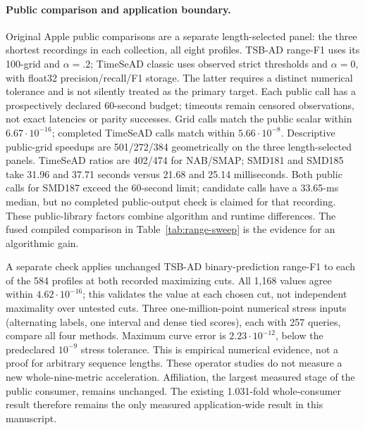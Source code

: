 \paragraph{Public comparison and application boundary.}
Original Apple public comparisons are a separate length-selected panel: the three
shortest recordings in each collection, all eight profiles. TSB-AD range-F1
uses its 100-grid and $\alpha=.2$; TimeSeAD classic uses observed strict
thresholds and $\alpha=0$, with float32 precision/recall/F1 storage. The latter
requires a distinct numerical tolerance and is not silently treated as the
primary target. Each public call has a prospectively declared 60-second budget;
timeouts remain censored observations, not exact latencies or parity successes.
Grid calls match the public scalar within $6.67\cdot10^{-16}$; completed
TimeSeAD calls match within $5.66\cdot10^{-8}$. Descriptive public-grid speedups
are 501/272/384 geometrically on the three length-selected panels. TimeSeAD
ratios are 402/474 for NAB/SMAP; SMD181 and SMD185 take 31.96 and 37.71 seconds
versus 21.68 and 25.14 milliseconds. Both public calls for SMD187 exceed the
60-second limit; candidate calls have a 33.65-ms median, but no completed
public-output check is claimed for that recording. These public-library factors
combine algorithm and runtime differences. The fused compiled comparison in
Table~\ref{tab:range-sweep} is the evidence for an algorithmic gain.

A separate check applies unchanged TSB-AD binary-prediction range-F1 to each
of the 584 profiles at both recorded maximizing cuts. All 1,168 values agree
within $4.62\cdot10^{-16}$; this validates the value at each chosen cut, not
independent maximality over untested cuts. Three one-million-point numerical
stress inputs (alternating labels, one interval and dense tied scores), each
with 257 queries, compare all four methods. Maximum curve error is
$2.23\cdot10^{-12}$, below the predeclared $10^{-9}$ stress tolerance. This is
empirical numerical evidence, not a proof for arbitrary sequence lengths.
These operator studies do not measure a new whole-nine-metric acceleration.
Affiliation, the largest measured stage of the public consumer, remains
unchanged. The existing 1.031-fold whole-consumer result therefore remains the
only measured application-wide result in this manuscript.
